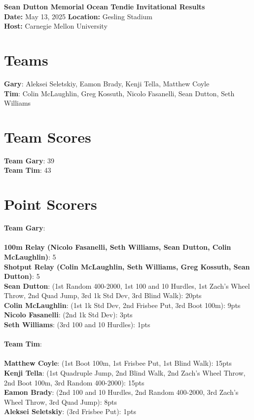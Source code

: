 \documentclass[10pt]{article}
\begin{document}
\begin{center}
    \LARGE \textbf{Sean Dutton Memorial Ocean Tendie Invitational Results} \\
    \large
    \vspace{0.5em}
    \textbf{Date:} May 13, 2025 \hspace{2cm} \textbf{Location:} Gesling Stadium \\
    \textbf{Host:} Carnegie Mellon University
\end{center}

\vspace{1em}
            
\section*{Teams}

\textbf{Gary}: Aleksei Seletskiy, Eamon Brady, Kenji Tella, Matthew Coyle
\\\textbf{Tim}: Colin McLaughlin, Greg Kossuth, Nicolo Fasanelli, Sean Dutton, Seth Williams

\section*{Team Scores}
\textbf{Team Gary}: 39
\\\textbf{Team Tim}: 43

\section*{Point Scorers}
\textbf{Team Gary}: \\
\vspace{.1em} \\
\textbf{100m Relay (Nicolo Fasanelli, Seth Williams, Sean Dutton, Colin McLaughlin)}: 5 \\
\textbf{Shotput Relay (Colin McLaughlin, Seth Williams, Greg Kossuth, Sean Dutton)}: 5 \\
\textbf{Sean Dutton}: (1st Random 400-2000, 1st 100 and 10 Hurdles, 1st Zach's Wheel Throw, 2nd Quad Jump, 3rd 1k Std Dev, 3rd Blind Walk): 20pts \\
\textbf{Colin McLaughlin}: (1st 1k Std Dev, 2nd Frisbee Put, 3rd Boot 100m): 9pts \\
\textbf{Nicolo Fasanelli}: (2nd 1k Std Dev): 3pts \\
\textbf{Seth Williams}: (3rd 100 and 10 Hurdles): 1pts \\
\vspace{1em} \\
\textbf{Team Tim}: \\
\vspace{.1em} \\
\textbf{Matthew Coyle}: (1st Boot 100m, 1st Frisbee Put, 1st Blind Walk): 15pts \\
\textbf{Kenji Tella}: (1st Quadruple Jump, 2nd Blind Walk, 2nd Zach's Wheel Throw, 2nd Boot 100m, 3rd Random 400-2000): 15pts \\
\textbf{Eamon Brady}: (2nd 100 and 10 Hurdles, 2nd Random 400-2000, 3rd Zach's Wheel Throw, 3rd Quad Jump): 8pts \\
\textbf{Aleksei Seletskiy}: (3rd Frisbee Put): 1pts \\
\end{document}

